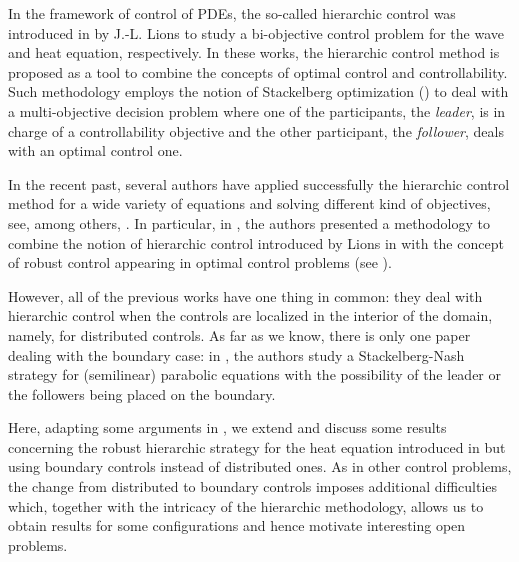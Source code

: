 \documentclass[preprint,10pt]{article}
\numberwithin{equation}{section}
\numberwithin{theorem}{section}
\newcommand\magenta[1]{{\color{magenta} #1}}
\begin{document}
{%

In the framework of control of PDEs, the so-called hierarchic control was introduced in \cite{LionsHier,LionsSta} by J.-L. Lions to study a bi-objective control problem for the wave and heat equation, respectively. In these works, the hierarchic control method is proposed as a tool to combine the concepts of optimal control and controllability. Such methodology employs the notion of Stackelberg optimization (\cite{Stackelber}) to deal with a multi-objective decision problem where one of the participants, the \emph{leader}, is in charge of a controllability objective and the other participant, the \emph{follower}, deals with an optimal control one. 

In the recent past, several authors have applied successfully the hierarchic control method for a wide variety of equations and solving different kind of objectives, see, among others, \cite{a_araujo,araruna,araruna1,carreno,Guillen,vhs_deT_rob,jesus,montoya}. In  particular, in \cite{vhs_deT_rob}, the authors presented a methodology to combine the notion of hierarchic control introduced by Lions in \cite{LionsSta} with the concept of robust control appearing in optimal control problems (see \cite{aziz,temam,temam_nonlinear}). 

However, all of the previous works have one thing in common: they deal with hierarchic control when the controls are localized in the interior of the domain, namely, for distributed controls. As far as we know, there is only one paper dealing with the boundary case: in \cite{da_silva}, the authors study a Stackelberg-Nash strategy for  (semilinear) parabolic equations with the possibility of the leader or the followers being placed on the boundary. 

Here, adapting some arguments in \cite{da_silva}, we extend and discuss some results concerning the robust hierarchic strategy for the heat equation introduced in \cite{vhs_deT_rob} but using boundary controls instead of distributed ones. \magenta{As in other control problems, the change from distributed to boundary controls imposes additional difficulties which, together with the intricacy of the hierarchic methodology,  allows us to obtain results for some configurations and hence motivate interesting open problems. }

}
\end{document}
